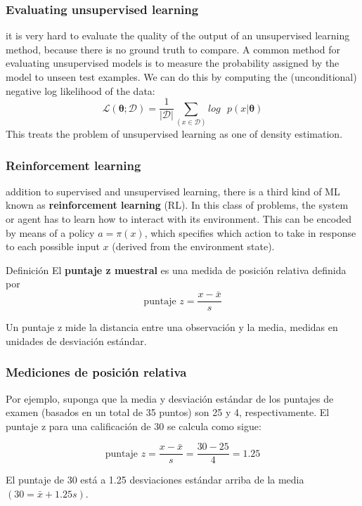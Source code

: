\documentclass[spanish]{beamer}
\begin{document}
\begin{frame}
\frametitle{Evaluating unsupervised learning}
it is very hard to evaluate the quality of the output of
an unsupervised learning method, because there is no ground truth to compare. A common method for evaluating unsupervised models is to measure the probability assigned by the model to unseen test examples. We can do this by computing the (unconditional) negative log likelihood of the data: 
\begin{equation*}
\mathcal{L}(\mathbf{\theta}; \mathcal{D})= \frac{1}{\vert \mathcal{D} \vert } \sum_{(x\in \mathcal{D} ) }log\text{ } p(x\vert \mathbf{\theta}) 
\end{equation*}
This treats the problem of unsupervised learning as one of density estimation.                                                                                

\end{frame}
\begin{frame}
\frametitle{Reinforcement learning}
addition to supervised and unsupervised learning, there is a third kind of ML known as \textbf{reinforcement learning} (RL). In this class of problems, the system or agent has to learn how to interact with its environment. This can be encoded by means of a policy $a =\pi(x)$, which specifies which action to take in response to each possible input $x$ (derived from the environment state).

\begin{block}{Definición}
El \textbf{puntaje z muestral} es una medida de posición relativa definida
por
\begin{equation*}
\text{puntaje } z = \frac{x-\bar{x}}{s}
\end{equation*}
\end{block}

Un puntaje z mide la distancia entre una observación y la media, medidas en unidades de desviación estándar.

\end{frame}
\begin{frame}
\frametitle{Mediciones de posición relativa }
Por ejemplo, suponga que la media y desviación estándar de los puntajes de examen (basados en un total de 35 puntos) son 25 y 4, respectivamente. El puntaje z para una calificación de 30 se calcula como sigue:

\begin{equation*}
\text{puntaje } z = \frac{x-\bar{x}}{s}=\frac{30-25}{4}=1.25
\end{equation*}

El puntaje de 30 está a 1.25 desviaciones estándar arriba de la media $(30 = \bar{x}+1.25s)$.
\end{frame}
\end{document}

